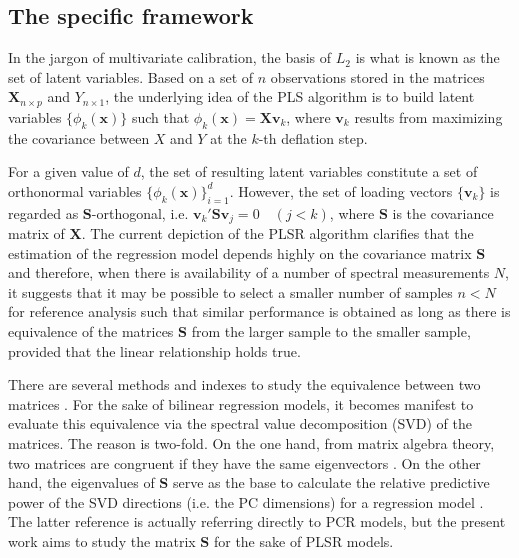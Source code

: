 \documentclass[journal=ancham,manuscript=article]{achemso}
\begin{document}
\subsection*{The specific framework}

In the jargon of multivariate calibration, the basis of $L_2$ is what is known as the set of latent variables. Based on a set of $n$ observations stored in the matrices $\mathbf{X}_{n\times p}$ and $Y_{n\times 1}$, the underlying idea of the PLS algorithm is to build latent variables $\{\phi_{k}(\mathbf{x})\}$ such that $\phi_k(\mathbf{x}) = \mathbf{Xv}_{k}$, where $\mathbf{v}_k$ results from maximizing the covariance between $X$ and $Y$ at the $k$-th deflation step. 

For a given value of $d$, the set of resulting latent variables constitute a set of orthonormal variables $\{\phi_{k}(\mathbf{x})\}_{i=1}^d$. However, the set of loading vectors $\{\mathbf{v}_k\}$ is regarded as $\mathbf{S}$-orthogonal, i.e. $\mathbf{v}_k'\mathbf{S}\mathbf{v}_j = 0 \quad (j<k)$, where $\mathbf{S}$ is the covariance matrix of $\mathbf{X}$. The current depiction of the PLSR algorithm clarifies that the estimation of the regression model depends highly on the covariance matrix $\mathbf{S}$ and therefore, when there is availability of a number of spectral measurements $N$, it suggests that it may be possible to select a smaller number of samples $n<N$ for reference analysis such that similar performance is obtained as long as there is equivalence of the matrices $\mathbf{S}$ from the larger sample to the smaller sample, provided that the linear relationship holds true. 

There are several methods and indexes to study the equivalence between two matrices \cite{Tomic2013}. For the sake of bilinear regression models, it becomes manifest to evaluate this equivalence via the spectral value decomposition (SVD) of the matrices. The reason is two-fold. On the one hand, from matrix algebra theory, two matrices are congruent if they have the same eigenvectors \cite{Horn1985}. On the other hand, the eigenvalues of $\mathbf{S}$ serve as the base to calculate the relative predictive power of the SVD directions (i.e. the PC dimensions) for a regression model \cite{Artemiou2013}. The latter reference is actually referring directly to PCR models, but the present work aims to study the matrix $\mathbf{S}$ for the sake of PLSR models.

\end{document}
